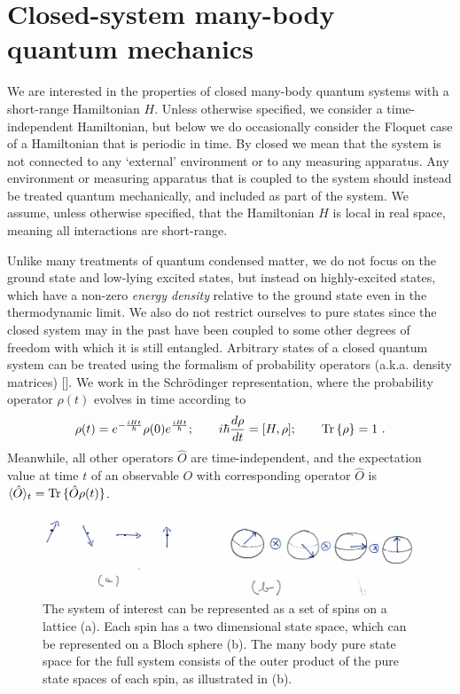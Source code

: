 \documentclass[amsmath,onecolumn, superscriptaddress,preprint,aps]{revtex4}
\newcommand{\Tr}{{\rm Tr}\,}
\renewcommand{\cite}[1]{[\onlinecite{#1}]}
\begin{document}
  \section{Closed-system many-body quantum mechanics}
  \label{review}

 We are interested in the properties of closed
 many-body quantum systems with a short-range Hamiltonian $H$.  Unless otherwise specified, we consider a time-independent Hamiltonian,
 but below we do occasionally consider the Floquet case of a
 Hamiltonian that is periodic in time.
 By closed we mean that the system is not connected to any `external' environment or to any measuring apparatus.
 Any environment or measuring apparatus that is coupled to the system should instead be treated quantum mechanically, and included as part of the system.
 We assume, unless otherwise specified, that the Hamiltonian $H$ is local in real space, meaning all interactions are short-range.

 Unlike many treatments of quantum condensed matter, we do not focus on the ground state and low-lying excited states, but instead on highly-excited states, which have a non-zero {\it energy density} relative to the ground state even in the thermodynamic limit.  We also do not restrict ourselves to pure states since the closed system may in the past have been coupled to some other degrees of freedom with which it is still entangled. Arbitrary states of a closed quantum system can be treated using the formalism of probability operators (a.k.a. density matrices) \cite{sakurai}.  We work in the Schr\"odinger representation, where the probability operator $\rho(t)$ evolves in time according to
 \begin{equation}
 \rho(t) = e^{- \frac{i H t}{\hbar}} \rho(0) e^{\frac{i H t}{\hbar}}; \qquad i \hbar \frac{d\rho}{dt} = [H, \rho]; \qquad \Tr\{\rho\}=1~.\label{eq: time evolution}
 \end{equation}
 Meanwhile, all other operators $\hat O$ are time-independent, and the expectation value at time $t$ of an observable $O$ with corresponding operator $\hat O$ is
 $\langle\hat O\rangle_t=\Tr\{\hat O \rho(t)\}$.


\begin{figure}
\includegraphics{FIg1}
\caption{The system of interest can be represented as a set of spins on a lattice (a). Each spin has a two dimensional state space, which can be represented on a Bloch sphere (b). The many body pure state space for the full system consists of the outer product of the pure state spaces of each spin, as illustrated in (b).\label{fig1}}
\end{figure}
\end{document}
